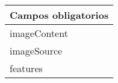\begin{table}[h!]
\begin{tabular}{|l|l}
\\ \hline
\multicolumn{2}{|l|}{\textbf{Campos obligatorios}}                                                                                                                                                                                              \\ \hline
\multicolumn{2}{|l|}{imageContent}                                                                                                                                                                                                              \\
\multicolumn{2}{|l|}{imageSource}                                                                                                                                                                                                               \\
\multicolumn{2}{|l|}{features}                                                                                                                                                                                                                  \\ \hline
\end{tabular}
\end{table}



